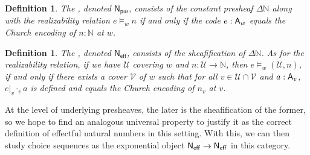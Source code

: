 \documentclass{easychair}
\newtheorem{defn}[thrm]{Definition}
\begin{document}
\begin{defn}
  The , denoted
  \(\mathsf{N}_\mathsf{pur}\), consists of the constant presheaf
  \(\Delta\mathbb{N}\) along with the realizability relation \(e \vDash_{w} n\)
  if and only if the code \(e : \mathsf{A}_{w}\) equals the Church encoding of
  \(n : \mathbb{N}\) at \(w\).
\end{defn}

\begin{defn}
  The , denoted
  \(\mathsf{N}_\mathsf{eff}\), consists of the sheafification of \(\Delta\mathbb{N}\).
  As for the realizability relation, if we have \(\mathcal{U}\) covering \(w\)
  and \(n : \mathcal{U} \to \mathbb{N}\), then
  \(e \vDash_{w} (\mathcal{U}, n)\), if and only if there exists a cover
  \(\mathcal{V}\) of \(w\) such that for all
  \(v \in \mathcal{U} \cap \mathcal{V}\) and \(a : \mathsf{A}_{v}\),
  \({e|_{v}} \cdot_{v} a\) is defined and equals the Church encoding of
  \(n_{v}\) at \(v\).
\end{defn}

At the level of underlying presheaves, the later is the sheafification of the
former, so we hope to find an analogous universal property to justify it as the
correct definition of effectful natural numbers in this setting.
%
With this, we can then study choice sequences as the exponential object
\({{\mathsf{N}_{\mathsf{eff}}}\to{\mathsf{N}_{\mathsf{eff}}}}\) in this category.


%
%
%


\end{document}

